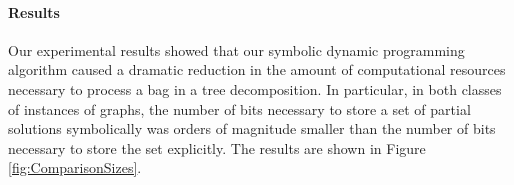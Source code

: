 


\paragraph*{Results}

Our experimental results showed that our symbolic dynamic programming algorithm caused a dramatic reduction in the amount of computational resources necessary to process a bag in a tree decomposition. In particular, in both classes of instances of graphs, the number of bits necessary to store a set of partial solutions symbolically was orders of magnitude smaller than the number of bits necessary to store the set explicitly. The results are shown in Figure \ref{fig:ComparisonSizes}. 

